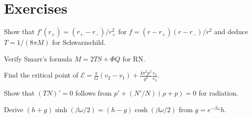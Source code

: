 \section*{Exercises}
\begin{exercise}
Show that $f'(r_+)=(r_+-r_-)/r_+^2$ for $f=(r-r_+)(r-r_-)/r^2$ and deduce $T=1/(8\pi M)$ for Schwarzschild.
\end{exercise}
\begin{exercise}
Verify Smarr's formula $M=2TS+\Phi Q$ for RN.
\end{exercise}
\begin{exercise}
Find the critical point of $\mathcal E=\frac\pi G(v_2-v_1)+\frac{4\pi^2p^2}{g^2}\frac{v_1}{v_2}$.
\end{exercise}
\begin{exercise}
Show that $(TN)'=0$ follows from $p'+(N'/N)(\rho+p)=0$ for radiation.
\end{exercise}
\begin{exercise}
Derive $(h+g)\sinh(\beta\omega/2)=(h-g)\cosh(\beta\omega/2)$ from $g=e^{-\beta\omega}h$.
\end{exercise}

